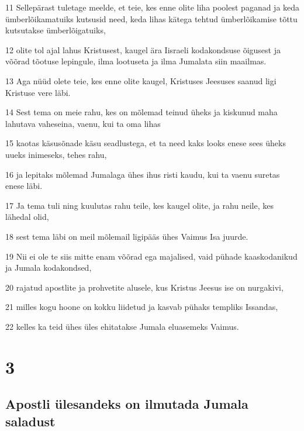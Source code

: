 \par 11 Sellepärast tuletage meelde, et teie, kes enne olite liha poolest paganad ja keda ümberlõikamatuiks kutsusid need, keda lihas kätega tehtud ümberlõikamise tõttu kutsutakse ümberlõigatuiks,
\par 12 olite tol ajal lahus Kristusest, kaugel ära Iisraeli kodakondsuse õigusest ja võõrad tõotuse lepingule, ilma lootuseta ja ilma Jumalata siin maailmas.
\par 13 Aga nüüd olete teie, kes enne olite kaugel, Kristuses Jeesuses saanud ligi Kristuse vere läbi.
\par 14 Sest tema on meie rahu, kes on mõlemad teinud üheks ja kiskunud maha lahutava vaheseina, vaenu, kui ta oma lihas
\par 15 kaotas käsusõnade käsu seadlustega, et ta need kaks looks enese sees üheks uueks inimeseks, tehes rahu,
\par 16 ja lepitaks mõlemad Jumalaga ühes ihus risti kaudu, kui ta vaenu suretas enese läbi.
\par 17 Ja tema tuli ning kuulutas rahu teile, kes kaugel olite, ja rahu neile, kes lähedal olid,
\par 18 sest tema läbi on meil mõlemail ligipääs ühes Vaimus Isa juurde.
\par 19 Nii ei ole te siis mitte enam võõrad ega majalised, vaid pühade kaaskodanikud ja Jumala kodakondsed,
\par 20 rajatud apostlite ja prohvetite alusele, kus Kristus Jeesus ise on nurgakivi,
\par 21 milles kogu hoone on kokku liidetud ja kasvab pühaks templiks Issandas,
\par 22 kelles ka teid ühes üles ehitatakse Jumala eluasemeks Vaimus.


\chapter{3}

\section*{Apostli ülesandeks on ilmutada Jumala saladust}

